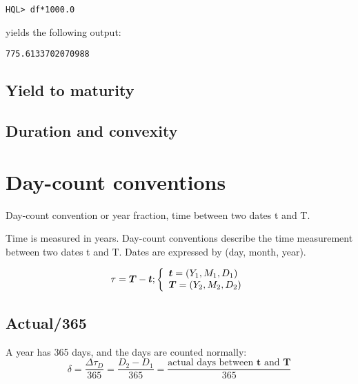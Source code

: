 \documentclass[11pt,a4paper]{article}
\numberwithin{equation}{section}
\begin{document}
\begin{lstlisting}
HQL> df*1000.0
\end{lstlisting}
yields the following output:
\FrameSep
\begin{lstlisting}[style=Output]
775.6133702070988
\end{lstlisting}

\subsection{Yield to maturity}
\subsection{Duration and convexity}

\section{Day-count conventions}
Day-count convention or year fraction, time between two dates t and T.



Time is measured in years. Day-count conventions describe the time measurement between two
dates t and T. Dates are expressed by (day, month, year). 

\[ \tau = \boldsymbol{T} - \boldsymbol{t};  \left\{
  \begin{array}{l l}
      \boldsymbol{t} = (Y_1, M_1, D_1) \\
\boldsymbol{T}=(Y_2,M_2,D_2)
  \end{array} \right.\]


\subsection{Actual/365}
A year has 365 days, and the days are counted normally:
\[
\delta = \frac{\Delta \tau_D}{365} = \frac{D_2-D_1}{365} = \frac{\text{actual days between } \boldsymbol{t} \text{ and } \boldsymbol{T}}{365}
\]
\end{document}
